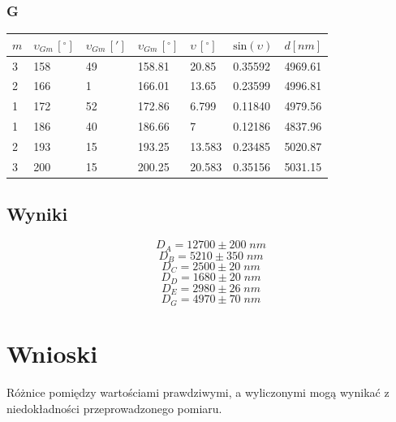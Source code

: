 \documentclass[a4paper, 11pt]{article}
\begin{document}
\subsubsection{G}\label{sec:g} %
\begin{center}
	\begin{tabular}{|l|l|l|l|l|l|l|}
		\hline
		$m $ & $\upsilon_{Gm} \, [^{\circ}]$ & $\upsilon_{Gm} \, [']$ & $\upsilon_{Gm} \, [^{\circ}]$ & $\upsilon \, [^{\circ}]$ & $\text{sin}(\upsilon)$ & $d [nm]$ \\ \hline
		3    & 158                           & 49                     & 158.81                        & 20.85                    & 0.35592                & 4969.61  \\ \hline
		2    & 166                           & 1                      & 166.01                        & 13.65                    & 0.23599                & 4996.81  \\ \hline
		1    & 172                           & 52                     & 172.86                        & 6.799                    & 0.11840                & 4979.56  \\ \hline
		1    & 186                           & 40                     & 186.66                        & 7                        & 0.12186                & 4837.96  \\ \hline
		2    & 193                           & 15                     & 193.25                        & 13.583                   & 0.23485                & 5020.87  \\ \hline
		3    & 200                           & 15                     & 200.25                        & 20.583                   & 0.35156                & 5031.15  \\ \hline
	\end{tabular}
\end{center}


\subsection{Wyniki}\label{sub:wyniki} %
\Large
\[
	D_A = 12700 \pm 200 \; nm
\]
\[
	D_B = 5210 \pm 350 \; nm
\]
\[
	D_C = 2500 \pm 20 \; nm
\]
\[
	D_D = 1680 \pm 20 \; nm
\]
\[
	D_E = 2980 \pm 26 \; nm
\]
\[
	D_G = 4970 \pm 70 \; nm
\]
\normalsize


\section{Wnioski}\label{sec:wnioski} %
Różnice pomiędzy wartościami prawdziwymi, a wyliczonymi mogą wynikać z niedokładności przeprowadzonego pomiaru.
\end{document}

